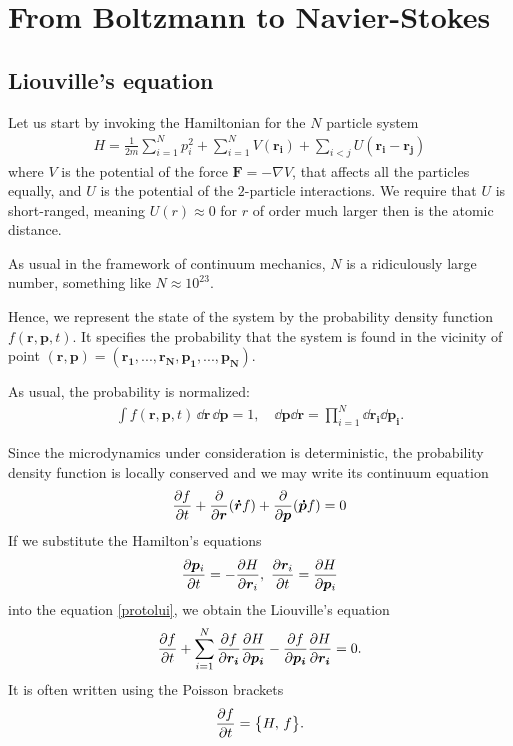 \chapter{From Boltzmann to Navier-Stokes}
	
\section{Liouville's equation}
Let us start by invoking the Hamiltonian for the $N$ particle system
\begin{align*}
H = \frac{1}{2m} \sum_{i=1}^N p_i^2 + \sum_{i=1}^N V(\bm{r_i}) + \sum_{i<j} U(\bm{r_i} - \bm{r_j})
\end{align*}
where $V$ is the potential of the force $\bm{F}= -\nabla V$, that affects all the particles equally, and $U$ is the potential of the $2$-particle interactions. We require that $U$ is short-ranged, meaning $U(r) \approx 0$ for $r$ of order much larger then is the atomic distance.

As usual in the framework of continuum mechanics, $N$ is a ridiculously large number, something like $N \approx 10^{23}$.

Hence, we represent the state of the system by the probability density function $f(\bm{r},\bm{p},t)$. It specifies the probability that the system is found in the vicinity of point $(\bm{r},\bm{p}) = (\bm{r_1},...,\bm{r_N},\bm{p_1},...,\bm{p_N})$.

As usual, the probability is normalized:
\begin{align*}
\int f(\bm{r},\bm{p},t) \, \dd\bm{r} \, \dd\bm{p} = 1, \quad \dd\bm{p} \dd\bm{r} = \prod_{i=1}^N \dd \bm{r_i} \dd \bm{p_i}.
\end{align*}

Since the microdynamics under consideration is deterministic, the probability density function is locally conserved and we may write its continuum equation
\begin{align} \label{protolui}
\frac{\partial f}{\partial t} + \frac{\partial}{\partial \bm{r}} (\bm{\dot{r}} f) + \frac{\partial}{\partial \bm{p}} (\bm{\dot{p}} f) = 0
\end{align}
If we substitute the Hamilton's equations 
\begin{align*}
\frac{\partial \bm{p}_i}{\partial t} = - \frac{\partial H}{\partial \bm{r}_i},~ \frac{\partial \bm{r}_i}{\partial t} = \frac{\partial H}{\partial \bm{p}_i}
\end{align*}
into the equation \ref{protolui}, we obtain the Liouville's equation
\begin{align*}
\frac{\partial f}{\partial t} + \sum_{i=1}^N \frac{\partial f}{\partial \bm{r_i}} \frac{\partial H}{\partial \bm{p_i}} - \frac{\partial f}{\partial \bm{p_i}}\frac{\partial H}{\partial \bm{r_i}} = 0.
\end{align*}
It is often written using the Poisson brackets
\begin{align} \label{lui}
\frac{\partial f}{\partial t} = \big\{ H, \, f \big\}.
\end{align}

